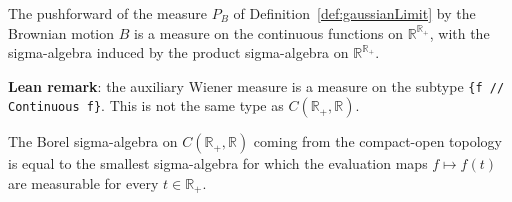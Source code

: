 \begin{definition}\label{def:wienerMeasureAux}
  \leanok
The pushforward of the measure $P_B$ of Definition~\ref{def:gaussianLimit} by the Brownian motion $B$ is a measure on the continuous functions on $\mathbb{R}^{\mathbb{R}_+}$, with the sigma-algebra induced by the product sigma-algebra on $\mathbb{R}^{\mathbb{R}_+}$.
\end{definition}

\textbf{Lean remark}: the auxiliary Wiener measure is a measure on the subtype \texttt{\{f  // Continuous f\}}. This is not the same type as $C(\mathbb{R}_+, \mathbb{R})$.


\begin{theorem}\label{thm:ContinuousMap.borel_eq_iSup_comap_eval}
  \leanok
The Borel sigma-algebra on $C(\mathbb{R}_+, \mathbb{R})$ coming from the compact-open topology is equal to the smallest sigma-algebra for which the evaluation maps $f \mapsto f(t)$ are measurable for every $t \in \mathbb{R}_+$.
\end{theorem}

